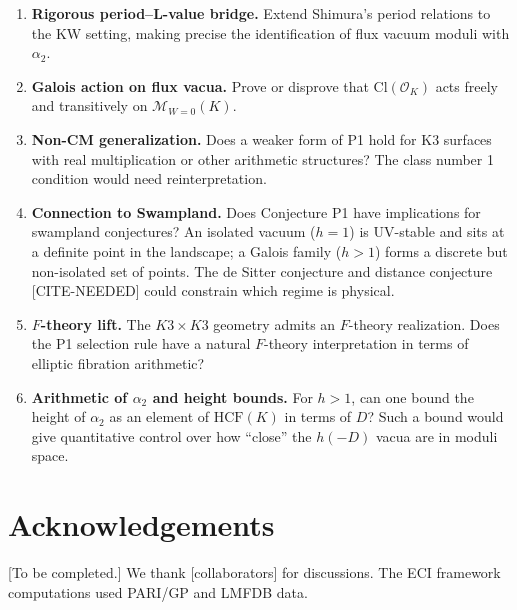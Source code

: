 \documentclass[12pt,a4paper]{article}
\theoremstyle{plain}
\theoremstyle{definition}
\newcommand{\OK}{\mathcal{O}_K}
\newcommand{\HCF}{\mathrm{HCF}}
\begin{document}
\begin{enumerate}
  \item \textbf{Rigorous period--L-value bridge.}
    Extend Shimura's period relations to the KW setting, making precise the
    identification of flux vacuum moduli with $\alpha_2$.

  \item \textbf{Galois action on flux vacua.}
    Prove or disprove that $\mathrm{Cl}(\OK)$ acts freely and transitively
    on $\mathcal{M}_{W=0}(K)$.

  \item \textbf{Non-CM generalization.}
    Does a weaker form of P1 hold for K3 surfaces with real multiplication
    or other arithmetic structures? The class number 1 condition would need
    reinterpretation.

  \item \textbf{Connection to Swampland.}
    Does Conjecture P1 have implications for swampland conjectures? An
    isolated vacuum ($h=1$) is UV-stable and sits at a definite point in
    the landscape; a Galois family ($h>1$) forms a discrete but non-isolated
    set of points. The de Sitter conjecture and distance conjecture
    [CITE-NEEDED] could constrain which regime is physical.

  \item \textbf{$F$-theory lift.}
    The $K3 \times K3$ geometry admits an $F$-theory realization. Does the
    P1 selection rule have a natural $F$-theory interpretation in terms of
    elliptic fibration arithmetic?

  \item \textbf{Arithmetic of $\alpha_2$ and height bounds.}
    For $h > 1$, can one bound the height of $\alpha_2$ as an element of
    $\HCF(K)$ in terms of $D$? Such a bound would give quantitative
    control over how ``close'' the $h(-D)$ vacua are in moduli space.
\end{enumerate}

\section*{Acknowledgements}

[To be completed.] We thank [collaborators] for discussions. The ECI
framework computations used PARI/GP and LMFDB data.

\end{document}

